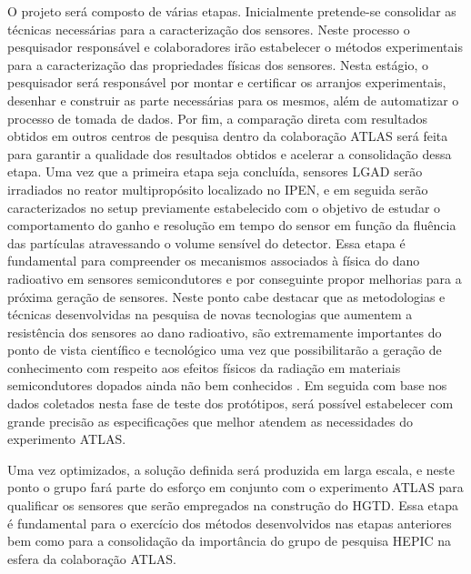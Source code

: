 O projeto será composto de várias etapas. Inicialmente pretende-se consolidar as técnicas necessárias para a caracterização dos sensores. Neste processo o pesquisador responsável e colaboradores irão estabelecer o métodos experimentais para a caracterização das propriedades físicas dos sensores. Nesta estágio, o pesquisador será responsável por montar e certificar os arranjos experimentais, desenhar e construir as parte necessárias para os mesmos, além de automatizar o processo de tomada de dados. Por fim, a comparação direta com resultados obtidos em outros centros de pesquisa dentro da colaboração ATLAS será feita para garantir a qualidade dos resultados obtidos e acelerar a consolidação dessa etapa.  
Uma vez que a primeira etapa seja concluída, sensores LGAD serão irradiados no reator multipropósito localizado no IPEN, e em seguida serão caracterizados no setup previamente estabelecido com o objetivo de estudar o comportamento do ganho e resolução em tempo do sensor em função da fluência das partículas atravessando o volume sensível do detector. Essa etapa é fundamental para compreender os mecanismos associados à física do dano radioativo em sensores semicondutores e por conseguinte propor melhorias para a próxima geração de sensores. 
Neste ponto cabe destacar que as metodologias e técnicas desenvolvidas na pesquisa de novas tecnologias que aumentem a resistência dos sensores ao dano radioativo, são extremamente importantes do ponto de vista científico e tecnológico uma vez que possibilitarão a geração de conhecimento com respeito aos efeitos físicos da radiação em materiais semicondutores dopados ainda não bem conhecidos \cite{tdr,JIN_LGAD,NIMA_LGAD}. %
Em seguida com base nos dados coletados nesta fase de teste dos protótipos, será possível estabelecer com grande precisão as especificações que melhor atendem as necessidades do experimento ATLAS. 

Uma vez optimizados, a solução definida será produzida em larga escala, e neste ponto o grupo fará parte do esforço em conjunto com o experimento ATLAS para qualificar os sensores que serão empregados na construção do HGTD. Essa etapa é fundamental para o exercício dos métodos desenvolvidos nas etapas anteriores bem como para a consolidação da importância do grupo de pesquisa HEPIC na esfera da colaboração ATLAS.


